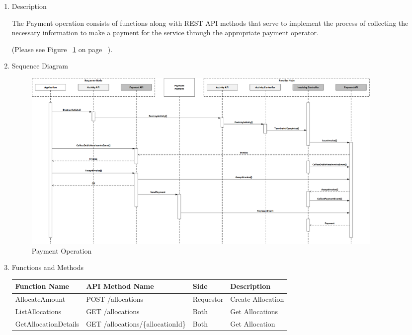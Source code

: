 \begin{enumerate}
\begin{enumerate}

\item Description

The Payment operation consists of functions along with REST API methods that serve to implement 
the process of collecting the necessary information to make a payment for the service through 
the appropriate payment operator.

(Please see Figure ~\ref{fig:PO} on page ~\pageref{fig:PO}).

\item Sequence Diagram

\begin{figure}[H]
    \centering
    \includegraphics[width=18cm,angle=0]{./diag/Sequence/PaymentPayment-B-Sequence.png}
	\caption{Payment Operation}
    \label{fig:PO}
\end{figure}

\item Functions and Methods

\begin{table}[H]
\footnotesize

\begin{center}
\begin{tabular}{|p{3cm}|p{7cm}|p{1.5cm}|p{4cm}|} 
\hline
\rowcolor{lightgray}	Function Name	& API Method Name				& 	Side		&	Description \\
\hline

AllocateAmount			&	POST /allocations							&	Requestor 	&	Create Allocation \\
\hline

ListAllocations			&	GET /allocations 							&	Both		&	Get Allocations	\\
\hline

GetAllocationDetails	&	GET /allocations/\{allocationId\} 			&	Both		&	Get Allocation	\\
\hline


\end{tabular}
\end{center}
\end{table}
\end{enumerate}
\end{enumerate}

